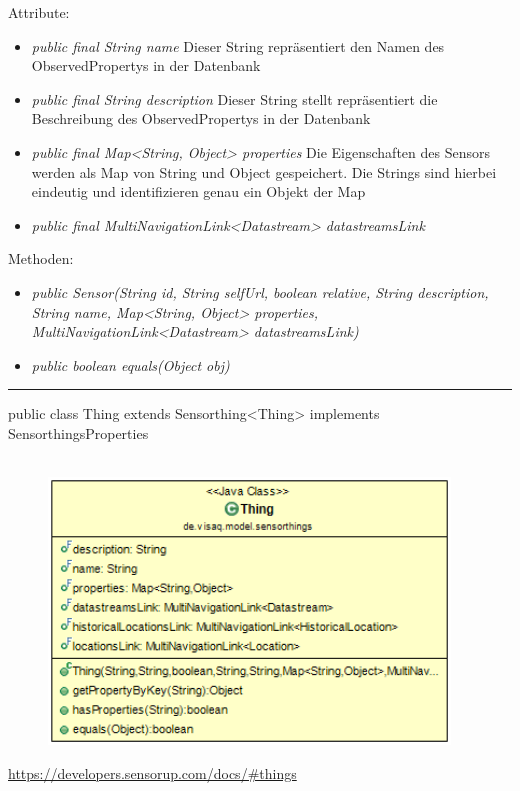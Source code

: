 Attribute:
\begin{itemize}
    \item \emph{public final String name} Dieser String repräsentiert den Namen des ObservedPropertys in der Datenbank
    \item \emph{public final String description} Dieser String stellt repräsentiert die Beschreibung des ObservedPropertys in der Datenbank
    \item \emph{public final Map<String, Object> properties} Die Eigenschaften des Sensors werden als Map von String und Object gespeichert. Die Strings sind hierbei eindeutig und identifizieren genau ein Objekt der Map
    \item \emph{public final MultiNavigationLink<Datastream> datastreamsLink} 
\end{itemize}
Methoden:
\begin{itemize}
    \item \emph{public Sensor(String id, String selfUrl, boolean relative, String description, String name, Map<String, Object> properties, MultiNavigationLink<Datastream> datastreamsLink)}
    \item \emph{public boolean equals(Object obj)} 
\end{itemize}

\rule{\textwidth}{0.4pt}
public class Thing extends Sensorthing<Thing> implements SensorthingsProperties
\\\\
\begin{minipage}{0.4\textwidth}
    \begin{figure}[H]
        {\centering\includegraphics[width=0.95\textwidth]{media/backend/modell/classes/Thing.png}}
    \end{figure}
    \end{minipage} \hfill
\begin{minipage}{0.6\textwidth}
    \url{https://developers.sensorup.com/docs/#things}
\end{minipage}

